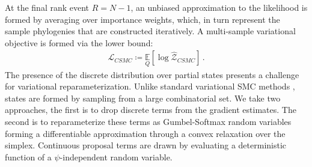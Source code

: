 \documentclass[accepted]{uai2021} %
\theoremstyle{definition}
\begin{document}
At the final rank event $R=N-1$, an unbiased approximation to the likelihood is formed by averaging over importance weights, which, in turn represent the sample phylogenies that are constructed iteratively. A multi-sample variational objective is formed via the lower bound:
\begin{align}
     \mathcal{L}_{CSMC} %
     \coloneqq \underset{Q}{\mathbb{E}}\left[\log \widehat{ \mathcal{Z}}_{CSMC} \right]\,.
\end{align}
The presence of the discrete distribution over partial states presents a challenge for variational reparameterization. Unlike standard variational SMC methods \citep{pmlr-v84-naesseth18a}, states are formed by sampling from a large combinatorial set. We take two approaches, the first is to drop discrete terms from the gradient estimates. The second is to reparameterize these terms as Gumbel-Softmax random variables forming a differentiable approximation through a convex relaxation over the simplex. Continuous proposal terms are drawn by evaluating a deterministic function of a $\psi$-independent random variable.
\end{document}
